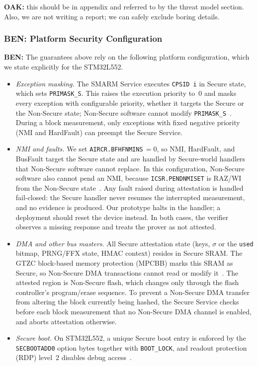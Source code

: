 \documentclass{ieeeaccess}
\DeclareRobustCommand{\oak}[1]{{\color{OAKcolor}\textbf{OAK:} #1}}
\DeclareRobustCommand{\ben}[1]{{\color{BENcolor}\textbf{BEN:} #1}}
\begin{document}
\oak{this should be in appendix and referred to by the threat model section. Also, we are not writing a report; we can safely exclude boring details.}
\subsubsection{\ben{Platform Security Configuration}}
\label{sec:platform-config}
\ben{The guarantees above rely on the following platform configuration, which we state explicitly for the STM32L552.
\begin{itemize}
  \item \emph{Exception masking.} The SMARM Service executes \texttt{CPSID~i} in Secure state, which sets \texttt{PRIMASK\_S}.
  This raises the execution priority to~$0$ and masks every exception with configurable priority, whether it targets the Secure or the Non-Secure state; Non-Secure software cannot modify \texttt{PRIMASK\_S}~\cite{armv8m-arm,pm0264}.
  During a block measurement, only exceptions with fixed negative priority (NMI and HardFault) can preempt the Secure Service.
  \item \emph{NMI and faults.} We set \texttt{AIRCR.BFHFNMINS}$\,=0$, so NMI, HardFault, and BusFault target the Secure state and are handled by Secure-world handlers that Non-Secure software cannot replace.
  In this configuration, Non-Secure software also cannot pend an NMI, because \texttt{ICSR.PENDNMISET} is RAZ/WI from the Non-Secure state~\cite{pm0264}.
  Any fault raised during attestation is handled fail-closed: the Secure handler never resumes the interrupted measurement, and no evidence is produced.
  Our prototype halts in the handler; a deployment should reset the device instead.
  In both cases, the verifier observes a missing response and treats the prover as not attested.
  \item \emph{DMA and other bus masters.} All Secure attestation state (keys, $\sigma$ or the \texttt{used} bitmap, PRNG/FFX state, HMAC context) resides in Secure SRAM.
  The GTZC block-based memory protection (MPCBB) marks this SRAM as Secure, so Non-Secure DMA transactions cannot read or modify it~\cite{an5347,kiri2026vecodi}.
  The attested region is Non-Secure flash, which changes only through the flash controller's program/erase sequence.
  To prevent a Non-Secure DMA transfer from altering the block currently being hashed, the Secure Service checks before each block measurement that no Non-Secure DMA channel is enabled, and aborts attestation otherwise.
  \item \emph{Secure boot.} On STM32L552, a unique Secure boot entry is enforced by the \texttt{SECBOOTADD0} option bytes together with \texttt{BOOT\_LOCK}, and readout protection (RDP) level~$2$ disables debug access~\cite{an5347}.

\end{itemize}}
\end{document}
